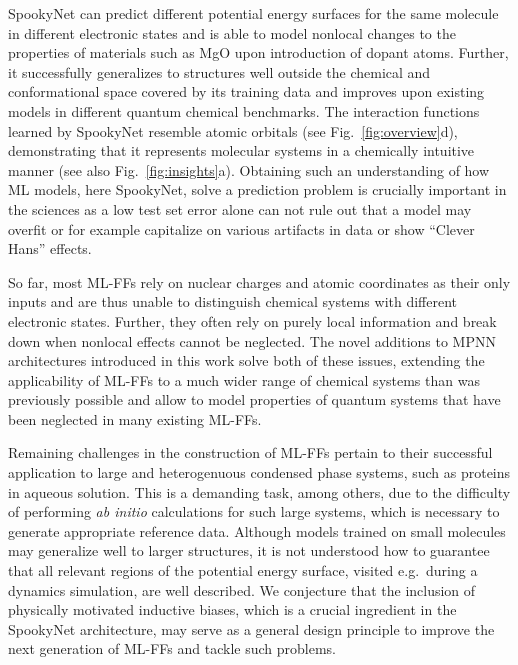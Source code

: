 \documentclass[%
superscriptaddress,
reprint,
nofootinbib,
amsmath,amssymb,amsfonts,
floatfix,
altaffilletter,
showkeys,
]{revtex4-2}
\newcommand{\nn}{SpookyNet}
\begin{document}
\nn{} can predict different potential energy surfaces for the same molecule in different electronic states and is able to model nonlocal changes to the properties of materials such as MgO upon introduction of dopant atoms. Further, it successfully generalizes to structures well outside the chemical and conformational space covered by its training data and improves upon existing models in different quantum chemical benchmarks. The interaction functions learned by \nn{} resemble atomic orbitals (see Fig.~\ref{fig:overview}d), demonstrating that it represents molecular systems in a chemically intuitive manner (see also Fig.~\ref{fig:insights}a). Obtaining such an understanding of how ML models,\cite{samek2019explainable} here \nn{},  solve a prediction problem is crucially important in the sciences as a low test set error\cite{hansen2013assessment} alone can not rule out that a model may overfit or for example capitalize on various artifacts in data\cite{samek2021explaining} or show ``Clever Hans'' effects.\cite{lapuschkin2019unmasking}

So far, most ML-FFs rely on nuclear charges and atomic coordinates as their only inputs and are thus unable to distinguish chemical systems with different electronic states. Further, they often rely on purely local information and break down when nonlocal effects cannot be neglected. The novel additions to MPNN architectures introduced in this work solve both of these issues, extending the applicability of ML-FFs to a much wider range of chemical systems than was previously possible and allow to model properties of quantum systems that have been neglected in many existing ML-FFs.

Remaining challenges in the construction of ML-FFs pertain to their successful application to large and heterogenuous condensed phase systems, such as proteins in aqueous solution. This is a demanding task, among others, due to the difficulty of performing \textit{ab initio} calculations for such large systems, which is necessary to generate appropriate reference data. Although models trained on small molecules may generalize well to larger structures, it is not understood how to guarantee that all relevant regions of the potential energy surface, visited e.g.\ during a dynamics simulation, are well described. We
conjecture that the inclusion of physically motivated inductive biases, which is a crucial ingredient in the \nn{} architecture, may serve as a general design principle to improve the next generation of ML-FFs and tackle such problems.
\end{document}
